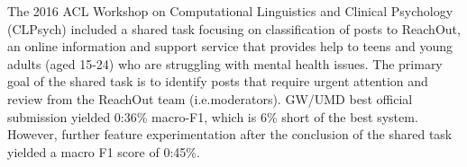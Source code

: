 The 2016 ACL Workshop on Computational Linguistics and Clinical Psychology (CLPsych) included a shared task focusing on classification of posts to ReachOut, an online information and support service that provides help to teens and young adults (aged 15-24) who are struggling with mental health issues. The primary goal of the shared task is to identify posts that require urgent attention and review from the ReachOut team (i.e.moderators). GW/UMD best official submission yielded 0:36\% macro-F1, which is 6\% short of the best system. However, further feature experimentation after the conclusion of the shared task yielded a macro F1 score of 0:45\%.
